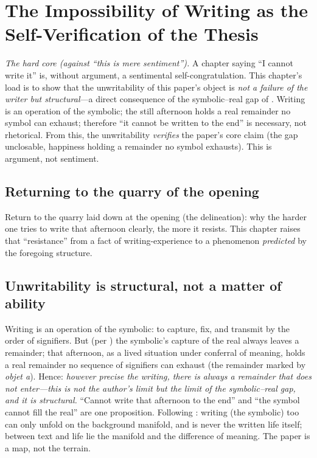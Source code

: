 \section{The Impossibility of Writing as the Self-Verification of the Thesis}
\label{p19:sec:unwritability}

\noindent
\emph{The hard core (against ``this is mere sentiment'').} A chapter saying ``I cannot write it'' is, without argument, a sentimental self-congratulation. This chapter's load is to show that the unwritability of this paper's object is \emph{not a failure of the writer but structural}---a direct consequence of the symbolic--real gap of . Writing is an operation of the symbolic; the still afternoon holds a real remainder no symbol can exhaust; therefore ``it cannot be written to the end'' is necessary, not rhetorical. From this, the unwritability \emph{verifies} the paper's core claim (the gap unclosable, happiness holding a remainder no symbol exhausts). This is argument, not sentiment.

\subsection{Returning to the quarry of the opening}
\label{p19:sub:unwrit-quarry}

Return to the quarry laid down at the opening (the delineation): why the harder one tries to write that afternoon clearly, the more it resists. This chapter raises that ``resistance'' from a fact of writing-experience to a phenomenon \emph{predicted} by the foregoing structure.

\subsection{Unwritability is structural, not a matter of ability}
\label{p19:sub:unwrit-structural}

Writing is an operation of the symbolic: to capture, fix, and transmit by the order of signifiers. But (per ) the symbolic's capture of the real always leaves a remainder; that afternoon, as a lived situation under conferral of meaning, holds a real remainder no sequence of signifiers can exhaust (the remainder marked by \emph{objet a}). Hence: \emph{however precise the writing, there is always a remainder that does not enter---this is not the author's limit but the limit of the symbolic--real gap, and it is structural.} ``Cannot write that afternoon to the end'' and ``the symbol cannot fill the real'' are one proposition. Following : writing (the symbolic) too can only unfold on the background manifold, and is never the written life itself; between text and life lie the manifold and the difference of meaning. The paper is a map, not the terrain.

